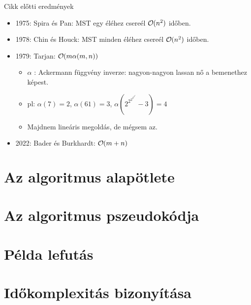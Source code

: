 \documentclass[aspectratio=169]{beamer}
\DeclareRobustCommand{\bigO}{
  \text{\usefont{OMS}{cmsy}{m}{n}O}
}
\begin{document}
\begin{frame}{Cikk előtti eredmények}
  \small
  \begin{itemize}
    \item 1975: Spira és Pan: MST egy éléhez csereél $ \bigO (n^2) $ időben.
    \item 1978: Chin és Houck: MST minden éléhez csereél $ \bigO (n^2) $ időben.
    \item 1979: Tarjan: $ \bigO (m \alpha (m, n))$
    \begin{itemize}
      \item $ \alpha $ : Ackermann függvény inverze: nagyon-nagyon lassan nő a bemenethez képest.
      \item pl: $ \alpha (7) = 2 $, $ \alpha (61) = 3 $, $ \alpha (2^{2^{2^{2^{2^{2^{2}}}}}} - 3) = 4 $ 
      \item Majdnem lineáris megoldás, de mégsem az.
    \end{itemize}
    \vspace{1.5em}
    \item 2022: Bader és Burkhardt: $ \bigO (m + n) $
  \end{itemize}
\end{frame}

\section{Az algoritmus alapötlete}


% 





\section{Az algoritmus pszeudokódja}




\section{Példa lefutás}


\section{Időkomplexitás bizonyítása}

\end{document}
